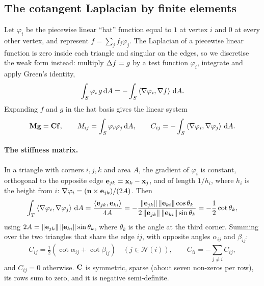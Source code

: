 \subsection{The cotangent Laplacian by finite elements}

Let $\varphi_i$ be the piecewise linear ``hat'' function equal to $1$ at vertex $i$ and $0$ at
every other vertex, and represent $f=\sum_jf_j\varphi_j$. The Laplacian of a piecewise linear
function is zero inside each triangle and singular on the edges, so we discretise the weak form
instead: multiply $\Delta f=g$ by a test function $\varphi_i$, integrate and apply Green's identity,
\begin{equation}
\int_S\varphi_i\,g\,\mathrm{d} A=-\int_S\left\langle \nabla\varphi_i,\nabla f\right\rangle\,\mathrm{d} A .
\end{equation}
Expanding $f$ and $g$ in the hat basis gives the linear system
\begin{equation}
\mathbf{M}\mathbf{g}=\mathbf{C}\mathbf{f},\qquad M_{ij}=\int_S\varphi_i\varphi_j\,\mathrm{d} A,\qquad C_{ij}=-\int_S\left\langle \nabla\varphi_i,\nabla\varphi_j\right\rangle\,\mathrm{d} A .
\end{equation}

\paragraph{The stiffness matrix.} In a triangle with corners $i,j,k$ and area $A$, the gradient of
$\varphi_i$ is constant, orthogonal to the opposite edge $\mathbf{e}_{jk}=\mathbf{x}_k-\mathbf{x}_j$, and of length
$1/h_i$, where $h_i$ is the height from $i$: $\nabla\varphi_i=(\mathbf{n}\times\mathbf{e}_{jk})/(2A)$. Then
\begin{equation}
\int_T\left\langle \nabla\varphi_i,\nabla\varphi_j\right\rangle\,\mathrm{d} A=\frac{\left\langle \mathbf{e}_{jk},\mathbf{e}_{ki}\right\rangle}{4A}
=-\frac{\left\lVert \mathbf{e}_{jk}\right\rVert\left\lVert \mathbf{e}_{ki}\right\rVert\cos\theta_k}{2\left\lVert \mathbf{e}_{jk}\right\rVert\left\lVert \mathbf{e}_{ki}\right\rVert\sin\theta_k}=-\frac12\cot\theta_k ,
\end{equation}
using $2A=\left\lVert \mathbf{e}_{jk}\right\rVert\left\lVert \mathbf{e}_{ki}\right\rVert\sin\theta_k$, where $\theta_k$ is the angle at the third
corner. Summing over the two triangles that share the edge $ij$, with opposite angles
$\alpha_{ij}$ and $\beta_{ij}$:
\begin{equation}
C_{ij}=\tfrac12(\cot\alpha_{ij}+\cot\beta_{ij})\quad(j\in\mathcal N(i)),\qquad C_{ii}=-\sum_{j\neq i}C_{ij},
\label{eq:cotan-matrix}
\end{equation}
and $C_{ij}=0$ otherwise. $\mathbf{C}$ is symmetric, sparse (about seven non-zeros per row), its rows sum to
zero, and it is negative semi-definite.


